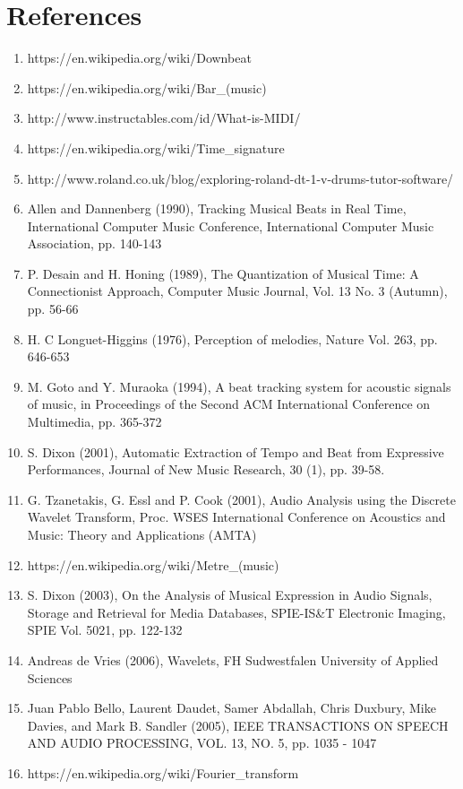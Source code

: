 \documentclass[a4paper, 11pt]{article}
\begin{document}
\section{References}
\begin{enumerate}
\item https://en.wikipedia.org/wiki/Downbeat
\item https://en.wikipedia.org/wiki/Bar\_(music)
\item http://www.instructables.com/id/What-is-MIDI/ %
\item https://en.wikipedia.org/wiki/Time\_signature
\item http://www.roland.co.uk/blog/exploring-roland-dt-1-v-drums-tutor-software/ %
\item Allen and Dannenberg (1990), Tracking Musical Beats in Real Time, International Computer Music Conference, International Computer Music Association, pp. 140-143 %
\item P. Desain and H. Honing (1989), The Quantization of Musical Time: A Connectionist Approach, Computer Music Journal, Vol. 13 No. 3 (Autumn), pp. 56-66 %
\item H. C Longuet-Higgins (1976), Perception of melodies, Nature Vol. 263, pp. 646-653 %
\item M. Goto and Y. Muraoka (1994), A beat tracking system for acoustic signals of music, in Proceedings of the Second ACM International Conference on Multimedia, pp. 365-372 %
\item S. Dixon (2001), Automatic Extraction of Tempo and Beat from Expressive Performances, Journal of New Music Research, 30 (1), pp. 39-58. %
\item G. Tzanetakis, G. Essl and P. Cook (2001), Audio Analysis using the Discrete Wavelet Transform, Proc. WSES International Conference on Acoustics and Music: Theory and Applications (AMTA) %
\item https://en.wikipedia.org/wiki/Metre\_(music)
\item S. Dixon (2003), On the Analysis of Musical Expression in Audio Signals, Storage and Retrieval for Media Databases, SPIE-IS\&T Electronic Imaging, SPIE Vol. 5021, pp. 122-132 %
\item Andreas de Vries (2006), Wavelets, FH Sudwestfalen University of Applied Sciences %
\item Juan Pablo Bello, Laurent Daudet, Samer Abdallah, Chris Duxbury, Mike Davies, and
Mark B. Sandler (2005), IEEE TRANSACTIONS ON SPEECH AND AUDIO PROCESSING, VOL. 13, NO. 5, pp. 1035 - 1047
\item https://en.wikipedia.org/wiki/Fourier\_transform

\end{enumerate}
\end{document}
